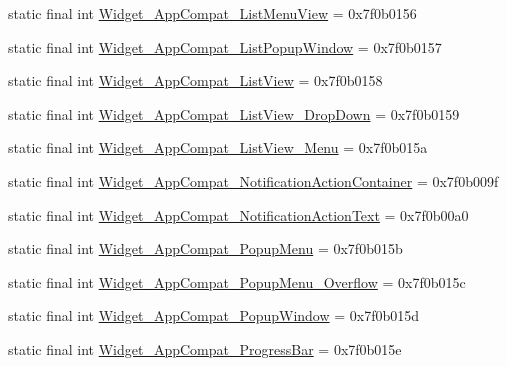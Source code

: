 \begin{CompactItemize}
\item 
static final int \hyperlink{classandroid_1_1support_1_1graphics_1_1drawable_1_1animated_1_1_r_1_1style_c60b3114de18082a73238f62ff148205}{Widget\_\-AppCompat\_\-ListMenuView} = 0x7f0b0156
\item 
static final int \hyperlink{classandroid_1_1support_1_1graphics_1_1drawable_1_1animated_1_1_r_1_1style_8daed04473705410aba0714d109009dc}{Widget\_\-AppCompat\_\-ListPopupWindow} = 0x7f0b0157
\item 
static final int \hyperlink{classandroid_1_1support_1_1graphics_1_1drawable_1_1animated_1_1_r_1_1style_4a5291ff192bef6c4021f238a9c4557c}{Widget\_\-AppCompat\_\-ListView} = 0x7f0b0158
\item 
static final int \hyperlink{classandroid_1_1support_1_1graphics_1_1drawable_1_1animated_1_1_r_1_1style_07940812d135dbce1759ee35d83abbca}{Widget\_\-AppCompat\_\-ListView\_\-DropDown} = 0x7f0b0159
\item 
static final int \hyperlink{classandroid_1_1support_1_1graphics_1_1drawable_1_1animated_1_1_r_1_1style_cbe8d140fd7e6f49b5bed1b75218f99a}{Widget\_\-AppCompat\_\-ListView\_\-Menu} = 0x7f0b015a
\item 
static final int \hyperlink{classandroid_1_1support_1_1graphics_1_1drawable_1_1animated_1_1_r_1_1style_956674c23b9ce2fa9cfd65628f1cbcc4}{Widget\_\-AppCompat\_\-NotificationActionContainer} = 0x7f0b009f
\item 
static final int \hyperlink{classandroid_1_1support_1_1graphics_1_1drawable_1_1animated_1_1_r_1_1style_e7c6488d6f11ab98d1c2e637b69ccea5}{Widget\_\-AppCompat\_\-NotificationActionText} = 0x7f0b00a0
\item 
static final int \hyperlink{classandroid_1_1support_1_1graphics_1_1drawable_1_1animated_1_1_r_1_1style_b543ce4f2ef48dad5223eaabddc0caa0}{Widget\_\-AppCompat\_\-PopupMenu} = 0x7f0b015b
\item 
static final int \hyperlink{classandroid_1_1support_1_1graphics_1_1drawable_1_1animated_1_1_r_1_1style_bc99ad1d8615248b15e07e3d3a0bc8ea}{Widget\_\-AppCompat\_\-PopupMenu\_\-Overflow} = 0x7f0b015c
\item 
static final int \hyperlink{classandroid_1_1support_1_1graphics_1_1drawable_1_1animated_1_1_r_1_1style_7e014a4d75f09105f43afc1aca4b8583}{Widget\_\-AppCompat\_\-PopupWindow} = 0x7f0b015d
\item 
static final int \hyperlink{classandroid_1_1support_1_1graphics_1_1drawable_1_1animated_1_1_r_1_1style_2a57d11f82e2e63073dff26c0bea59ca}{Widget\_\-AppCompat\_\-ProgressBar} = 0x7f0b015e

\end{CompactItemize}
